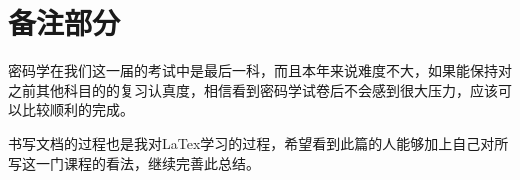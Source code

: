 \documentclass[UTF8]{ctexart}
\begin{document}
\newpage
\section{备注部分}
\large{密码学在我们这一届的考试中是最后一科，而且本年来说难度不大，如果能保持对之前其他科目的的复习认真度，相信看到密码学试卷后不会感到很大压力，应该可以比较顺利的完成。

书写文档的过程也是我对LaTex学习的过程，希望看到此篇的人能够加上自己对所写这一门课程的看法，继续完善此总结。}
\end{document}
